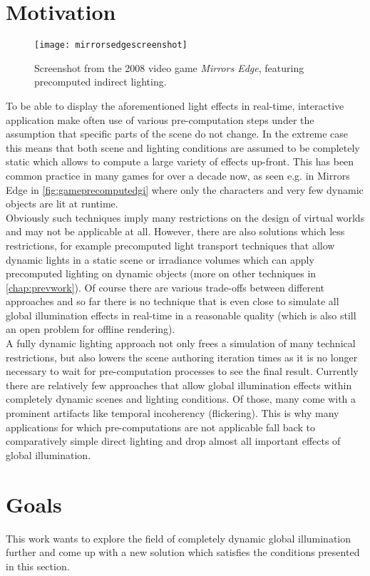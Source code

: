 \documentclass[thesis.tex]{subfiles}
\begin{document}
\section{Motivation}
\begin{figure}[h]
\centering
\texttt{[image: mirrorsedgescreenshot]}
\caption{Screenshot from the 2008 video game \emph{Mirrors Edge}, featuring precomputed indirect lighting.}
\label{fig:gameprecomputedgi}
\end{figure}
To be able to display the aforementioned light effects in real-time, interactive application make often use of various pre-computation steps under the assumption that specific parts of the scene do not change.
In the extreme case this means that both scene and lighting conditions are assumed to be completely static which allows to compute a large variety of effects up-front.
This has been common practice in many games for over a decade now, as seen e.g. in Mirrors Edge in \autoref{fig:gameprecomputedgi} where only the characters and very few dynamic objects are lit at runtime.
\\
Obviously such techniques imply many restrictions on the design of virtual worlds and may not be applicable at all.
However, there are also solutions which less restrictions, for example precomputed light transport techniques that allow dynamic lights in a static scene or irradiance volumes which can apply precomputed lighting on dynamic objects (more on other techniques in \autoref{chap:prevwork}).
Of course there are various trade-offs between different approaches and so far there is no technique that is even close to simulate all global illumination effects in real-time in a reasonable quality (which is also still an open problem for offline rendering).
\\
A fully dynamic lighting approach not only frees a simulation of many technical restrictions, but also lowers the scene authoring iteration times as it is no longer necessary to wait for pre-computation processes to see the final result.
Currently there are relatively few approaches that allow global illumination effects within completely dynamic scenes and lighting conditions.
Of those, many come with a prominent artifacts like temporal incoherency (flickering).
This is why many applications for which pre-computations are not applicable fall back to comparatively simple direct lighting and drop almost all important effects of global illumination.

\section{Goals}
This work wants to explore the field of completely dynamic global illumination further and come up with a new solution which satisfies the conditions presented in this section.
\end{document}
